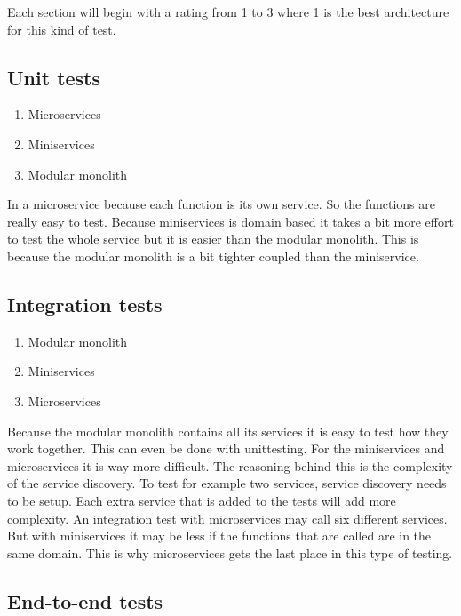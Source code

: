 Each section will begin with a rating from 1 to 3 where 1 is the best architecture for this kind of test.

\subsection{Unit tests}
\label{sec:UnitTests}

\begin{enumerate}
        \item Microservices
        \item Miniservices
        \item Modular monolith
\end{enumerate}

In a microservice because each function is its own service. So the functions are really easy to test. Because miniservices is domain based it takes a bit more effort to test the whole service but it is easier than the modular monolith. This is because the modular monolith is a bit tighter coupled than the miniservice.

\subsection{Integration tests}

\begin{enumerate}
        \item Modular monolith
        \item Miniservices
        \item Microservices
\end{enumerate}

Because the modular monolith contains all its services it is easy to test how they work together. This can even be done with unittesting. For the miniservices and microservices it is way more difficult. The reasoning behind this is the complexity of the service discovery. To test for example two services, service discovery needs to be setup. Each extra service that is added to the tests will add more complexity. An integration test with microservices may call six different services. But with miniservices it may be less if the functions that are called are in the same domain. This is why microservices gets the last place in this type of testing.

\subsection{End-to-end tests}

